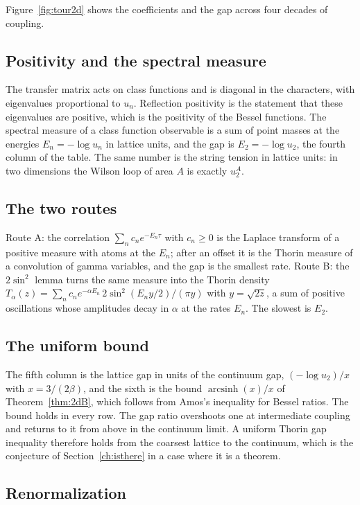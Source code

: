 Figure~\ref{fig:tour2d} shows the coefficients and the gap across four decades of coupling.

\subsection{Positivity and the spectral measure}

The transfer matrix acts on class functions and is diagonal in the characters, with eigenvalues proportional to $u_n$. Reflection positivity is the statement that these eigenvalues are positive, which is the positivity of the Bessel functions. The spectral measure of a class function observable is a sum of point masses at the energies $E_n=-\log u_n$ in lattice units, and the gap is $E_2=-\log u_2$, the fourth column of the table. The same number is the string tension in lattice units: in two dimensions the Wilson loop of area $A$ is exactly $u_2^A$.

\subsection{The two routes}

Route A: the correlation $\sum_nc_ne^{-E_n\tau}$ with $c_n\ge0$ is the Laplace transform of a positive measure with atoms at the $E_n$; after an offset it is the Thorin measure of a convolution of gamma variables, and the gap is the smallest rate. Route B: the $2\sin^2$ lemma turns the same measure into the Thorin density $T_\alpha(z)=\sum_nc_ne^{-\alpha E_n}\,2\sin^2(E_ny/2)/(\pi y)$ with $y=\sqrt{2z}$, a sum of positive oscillations whose amplitudes decay in $\alpha$ at the rates $E_n$. The slowest is $E_2$.

\subsection{The uniform bound}

The fifth column is the lattice gap in units of the continuum gap, $(-\log u_2)/x$ with $x=3/(2\beta)$, and the sixth is the bound $\operatorname{arcsinh}(x)/x$ of Theorem~\ref{thm:2dB}, which follows from Amos's inequality for Bessel ratios. The bound holds in every row. The gap ratio overshoots one at intermediate coupling and returns to it from above in the continuum limit. A uniform Thorin gap inequality therefore holds from the coarsest lattice to the continuum, which is the conjecture of Section~\ref{ch:isthere} in a case where it is a theorem.

\subsection{Renormalization}

